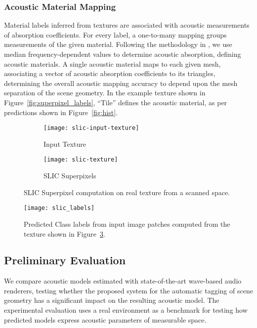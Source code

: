 \subsubsection{Acoustic Material Mapping}
Material labels inferred from textures are associated with acoustic measurements of absorption coefficients. For every label, a one-to-many mapping groups measurements of the given material. Following the methodology in \cite{kim2020acoustic}, we use median frequency-dependent values to determine acoustic absorption, defining acoustic materials. A single acoustic material maps to each given mesh, associating a vector of acoustic absorption coefficients to its triangles, determining the overall acoustic mapping accuracy to depend upon the mesh separation of the scene geometry. In the example texture shown in Figure~\ref{fig:superpixel_labels}, ``Tile'' defines the acoustic material, as per predictions shown in Figure~\ref{fig:hist}.
\begin{figure}
    \centering
    \begin{subfigure}[t]{0.49\textwidth}
       \centering
       \texttt{[image: slic-input-texture]}
       \caption{Input Texture}
       \label{fig:slic-input-texture}
    \end{subfigure}
    \begin{subfigure}[t]{0.49\textwidth}
       \centering
       \texttt{[image: slic-texture]}
       \caption{SLIC Superpixels}
       \label{fig:slic-labels}
    \end{subfigure}
\caption{SLIC Superpixel computation on real texture from a scanned space.}
\label{fig:slic-generation}
\end{figure}

\begin{figure}[htbp]
    \centering
    \texttt{[image: slic\_labels]}
    \caption{Predicted Class labels from input image patches computed from the texture shown in Figure~\ref{fig:slic-generation}.}
    \label{fig:slic-labels}
\end{figure}



\subsection{Preliminary Evaluation}
We compare acoustic models estimated with state-of-the-art wave-based audio renderers, testing whether the proposed system for the automatic tagging of scene geometry has a significant impact on the resulting acoustic model. The experimental evaluation uses a real environment as a benchmark for testing how predicted models express acoustic parameters of measurable space.

